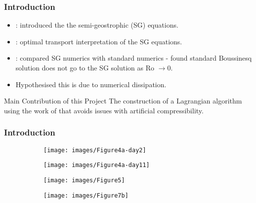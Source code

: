 \documentclass[10pt]{beamer}
\begin{document}
\frame
{
  \frametitle{Introduction}

  \begin{itemize}
  \item \cite{hoskins1971atmospheric}: introduced the the semi-geostrophic (SG) equations.
  
  \item \cite{shutts1987parcel}: optimal transport interpretation of the SG equations.

  \item \cite{visram2014framework}: compared SG numerics with standard numerics - found standard Boussinesq solution does not go to the SG solution as Ro \(\to 0\). 
  
  \item Hypothesised this is due to numerical dissipation. 
  
  \end{itemize}
  
\begin{block}{Main Contribution of this Project}
 The construction of a Lagrangian algorithm using the work of \cite{gallouet2016lagrangian} that avoids issues with artificial compressibility.
\end{block}

}

\frame
{
  \frametitle{Introduction}

\begin{figure}[H]
   \begin{subfigure}[t]{0.4\textwidth}
        \centering
        \texttt{[image: images/Figure4a-day2]}
        \caption{} \label{fig:colin1}
    \end{subfigure}
   \begin{subfigure}[t]{0.4\textwidth}
        \centering
	\texttt{[image: images/Figure4a-day11]}
        \caption{} \label{fig:vortices-1000}
    \end{subfigure}
   \begin{subfigure}[t]{0.4\textwidth}
        \centering
	\texttt{[image: images/Figure5]}
        \caption{} \label{fig:vortices-1900}
    \end{subfigure}
   \begin{subfigure}[t]{0.4\textwidth}
        \centering
        \texttt{[image: images/Figure7b]}
        \caption{} \label{fig:vortices-quiver0}
    \end{subfigure}
\centering
\caption{\cite{visram2014framework}}
\centering
\label{fig:colin}
\end{figure}
}
\end{document}
